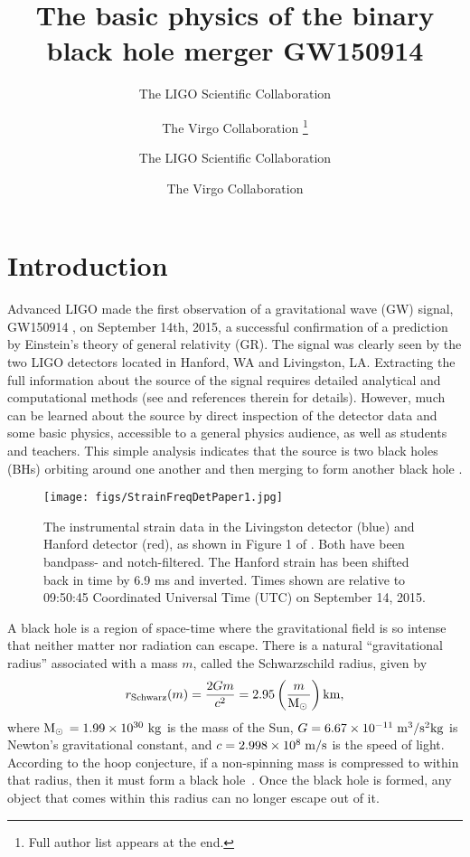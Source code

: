 \documentclass{andp2012}%
\author{The LIGO Scientific Collaboration
}
\author{The Virgo Collaboration
\footnote{Full author list appears at the end.}
}
\author{The LIGO Scientific Collaboration}
\affiliation{LSC}
\author{The Virgo Collaboration}
\affiliation{Virgo}
\title{The basic physics of the binary black hole merger GW150914}
\newcommand{\inlinecite}[1]{\cite{#1}}
\newcommand{\inlinecites}[1]{\cite{#1}}
\def\BH{black hole }		\def\BHs{black holes }			\def\BHns{black hole}		\def\BHsns{black holes}		\def\GW{gravitational wave }		\def\GWs{gravitational waves }				\def\GWns{gravitational wave}		\def\GWsns{gravitational waves}		\def\LR{light ring }		\def\ISCO{innermost stable circular orbit }		\def\NS{neutron star }		\def\NSs{neutron stars }		\def\GR{general relativity }
\newcommand{\Msun}{\ensuremath{\mathrm{M}_\odot\,}}
\begin{document}
\maketitle

\section{Introduction}
\label{Sec:intro}

Advanced LIGO made the first observation of a gravitational wave (GW) signal, GW150914 \cite{DetectionPaper},
on September 14th, 2015,
a successful confirmation of a prediction by
Einstein's theory of general relativity (GR).
The signal was clearly seen by the two LIGO detectors
located in Hanford, WA and Livingston, LA.
Extracting the full information about the source of the signal
requires detailed analytical and computational methods
(see \inlinecites{PEPaper, BetterPE, TestingGRPaper, AstroPaper, O1BBH}
and references therein for details).
However, much can be learned about the source
by direct inspection of the detector data
and some basic physics\cite{Schutz:1984nf},
accessible to a general physics audience,
as well as students and teachers.
This simple analysis indicates that the source is
two black holes (BHs) orbiting around one another
and then merging to form another \BH.

\begin{figure}[h!]
\centering
\texttt{[image: figs/StrainFreqDetPaper1.jpg]}
\caption{
 The instrumental strain data in the
 Livingston detector (blue) and Hanford detector (red),
 as shown in Figure 1 of \inlinecite{DetectionPaper}.
 Both have been bandpass- and notch-filtered.
 The Hanford strain has been shifted back in time by 6.9 ms and inverted.
 Times shown are relative to 09:50:45 Coordinated Universal Time (UTC) on September 14, 2015.
}
 \label{f:rawdata}
\end{figure}

A black hole is
a region of space-time
where the gravitational field is so intense
that neither matter nor radiation can escape.
There is a natural ``gravitational radius'' associated with a mass $m$,
called the Schwarzschild radius, given by
\begin{equation}
  r_{\rm Schwarz}(m) = \frac{2 G m}{c^2} = 2.95 \, \biggl(
  \frac{m}{\Msun} \biggr) \, {\rm km},
\end{equation}
where
$\Msun =1.99 \times 10^{30}~\rm{kg}$
is the mass of the Sun,
$G = 6.67 \times 10^{-11} \; {\rm m^3/s^2kg}$
is Newton's gravitational constant, and
$c = 2.998 \times 10^8 \; {\rm m/s}$
is the speed of light.
According to the hoop conjecture, if a non-spinning mass is compressed
to within that radius, then it must form a black hole~\cite{Thorne:1972ji}.
Once the \BH is formed,
any object that comes within this radius can no longer
escape out of it.
\end{document}
